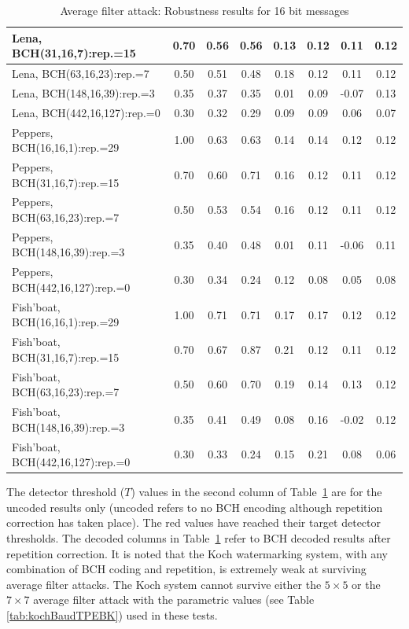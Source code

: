 \documentclass[12pt]{report}
\begin{document}
\begin{table}[htb]
{\begin{tabular}{|p{4.16cm}|c||c|c||c|c||c|c|}
Lena, BCH(31,16,7):rep.=15	&0.70	&0.56 			&0.56 &0.13 &0.12 &0.11 &0.12	\\ \hline
Lena, BCH(63,16,23):rep.=7	&0.50	&{\color{Red}0.51} 	&0.48 &0.18 &0.12 &0.11 &0.12	\\ \hline
Lena, BCH(148,16,39):rep.=3	&0.35	&{\color{Red}0.37} 	&0.35 &0.01 &0.09 &-0.07&0.13	\\ \hline
Lena, BCH(442,16,127):rep.=0	&0.30	&{\color{Red}0.32} 	&0.29 &0.09 &0.09 &0.06 &0.07	\\ \hline\hline
Peppers, BCH(16,16,1):rep.=29	&1.00	&0.63 			&0.63 &0.14 &0.14 &0.12 &0.12	\\ \hline
Peppers, BCH(31,16,7):rep.=15	&0.70	&0.60 			&0.71 &0.16 &0.12 &0.11 &0.12	\\ \hline
Peppers, BCH(63,16,23):rep.=7 	&0.50	&{\color{Red}0.53} 	&0.54 &0.16 &0.12 &0.11 &0.12	\\ \hline
Peppers, BCH(148,16,39):rep.=3 	&0.35	&{\color{Red}0.40} 	&0.48 &0.01 &0.11 &-0.06&0.11	\\ \hline
Peppers, BCH(442,16,127):rep.=0	&0.30	&{\color{Red}0.34} 	&0.24 &0.12 &0.08 &0.05 &0.08	\\ \hline\hline
Fish'boat, BCH(16,16,1):rep.=29			&1.00		&0.71 			&0.71 &0.17 &0.17 &0.12 &0.12	\\ \hline
Fish'boat, BCH(31,16,7):rep.=15			&0.70		&0.67 			&0.87 &0.21 &0.12 &0.11 &0.12	\\ \hline
Fish'boat, BCH(63,16,23):rep.=7			&0.50		&{\color{Red}0.60} 	&0.70 &0.19 &0.14 &0.13 &0.12	\\ \hline
Fish'boat, BCH(148,16,39):rep.=3		&0.35		&{\color{Red}0.41} 	&0.49 &0.08 &0.16 &-0.02&0.12	\\ \hline
Fish'boat, BCH(442,16,127):rep.=0		&0.30		&{\color{Red}0.33} 	&0.24 &0.15 &0.21 &0.08 &0.06	\\ \hline
\end{tabular}}
\normalsize
	\caption{Average filter attack: Robustness results for 16 bit messages}
	\label{tab:avFilt16RobResBK}
\end{table}
The detector threshold ($T$) values in the second column of Table~\ref{tab:avFilt16RobResBK} are for the uncoded 
results only (uncoded refers to no BCH encoding although repetition correction has taken place).
The {\color{Red}red} values have reached their target detector thresholds. 
The decoded columns in Table~\ref{tab:avFilt16RobResBK} refer to BCH decoded results after repetition correction.
It is noted that the Koch watermarking system, with any combination of BCH coding and repetition, is
extremely weak at surviving average filter attacks. The Koch system
cannot survive either the $5\times 5$ or the $7\times 7$ average filter attack with the
parametric values (see Table \ref{tab:kochBaudTPEBK}) used in these tests.
\end{document}
